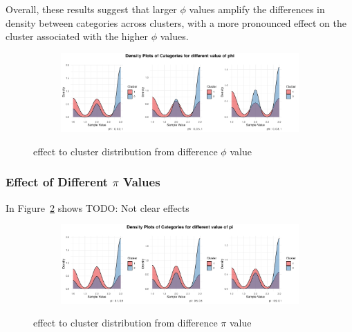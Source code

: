 \documentclass{article}
\begin{document}
Overall, these results suggest that larger $\phi$ values amplify the differences in density between categories across clusters, with a more pronounced effect on the cluster associated with the higher $\phi$ values.

\begin{figure}[h]
  \centering
  \begin{subfigure}{1.0\textwidth}
      \centering
      \includegraphics[width=\textwidth]{images/para_sim/phi.png}
  \end{subfigure}
  \caption{effect to cluster distribution from difference $\phi$ value}
  \label{fig:phi}
\end{figure}


\subsubsection*{Effect of Different $\pi$ Values}
In Figure~\ref{fig:pi} shows
 TODO: Not clear effects
\begin{figure}[h]
  \centering
  \begin{subfigure}{1.0\textwidth}
      \centering
      \includegraphics[width=\textwidth]{images/para_sim/pi.png}
  \end{subfigure}
  \caption{effect to cluster distribution from difference $\pi$ value}
  \label{fig:pi}
\end{figure}
\end{document}
